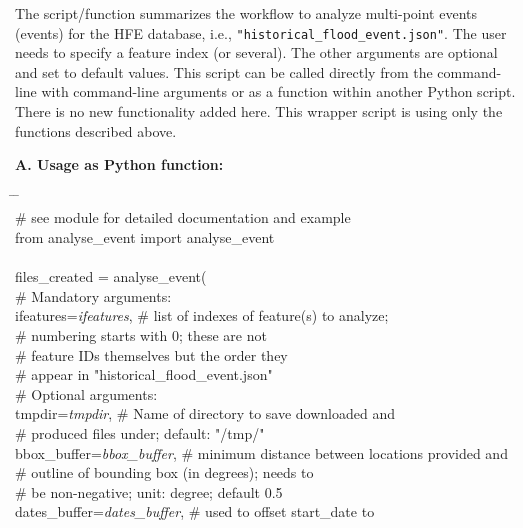 \documentclass[10pt,a4paper,titlepage,parskip]{scrartcl}
\newenvironment{ttfont}{\fontfamily{\ttdefault}\selectfont}{\par}
\newcommand{\GRAU}[1]{\textcolor{ufzgray2}{#1}}
\begin{document}
The script/function summarizes the workflow to analyze multi-point events (events) for the HFE database, i.e.,
\texttt{"historical\_flood\_event.json"}. The user needs to specify a feature index (or several). The other arguments are optional and
set to default values. This script can be called directly from the command-line with command-line arguments or as a function within another Python script. There is no new functionality added here. This wrapper script is using only the functions described above.

\textbf{A. Usage as Python function:}
\begin{framed}
	\vspace*{-1.2cm}
	\begin{ttfont}
		\begin{tabbing}
			\hspace{1.0cm} \= \hspace{5.2cm} \= \kill \\[4pt]
			\GRAU{\# see module for detailed documentation and example}\\
			from analyse\_event import analyse\_event\\
			\\
			files\_created = analyse\_event(\\
			\> \GRAU{\# Mandatory arguments:}\\
			\> ifeatures=\textit{ifeatures}, \> \GRAU{\# list of indexes of feature(s) to analyze;}\\
			\> \> \GRAU{\# numbering starts with 0; these are not }\\
			\> \> \GRAU{\# feature IDs themselves but the order they }\\
			\> \> \GRAU{\# appear in "historical\_flood\_event.json"}\\
			\> \GRAU{\# Optional arguments:}\\
			\> tmpdir=\textit{tmpdir}, \> \GRAU{\# Name of directory to save downloaded and}\\
			\> \> \GRAU{\# produced files under; default: "/tmp/"}\\
			\> bbox\_buffer=\textit{bbox\_buffer}, \> \GRAU{\# minimum distance between locations provided and}\\
			\> \> \GRAU{\# outline of bounding box (in degrees); needs to}\\
			\> \> \GRAU{\# be non-negative; unit: degree; default 0.5}\\
			\> dates\_buffer=\textit{dates\_buffer}, \> \GRAU{\# used to offset start\_date to}\\

\end{tabbing}
\end{ttfont}
\end{framed}
\end{document}
